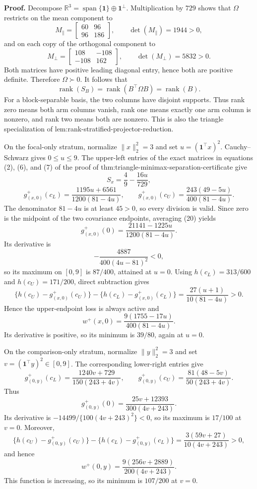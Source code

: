 \textbf{Proof.}
Decompose \(\mathbb R^3=\operatorname{span}\{\mathbf1\}\oplus\mathbf1^\perp\).  Multiplication by \(729\) shows that \(\Omega\) restricts on the mean component to
\[
 M_{\parallel}=\begin{bmatrix}60&96\\96&186\end{bmatrix},
 \qquad
 \det(M_{\parallel})=1944>0,
\]
and on each copy of the orthogonal component to
\[
 M_{\perp}=\begin{bmatrix}108&-108\\-108&162\end{bmatrix},
 \qquad
 \det(M_{\perp})=5832>0.
\]
Both matrices have positive leading diagonal entry, hence both are positive definite.  Therefore \(\Omega\succ0\).  It follows that
\[
 \operatorname{rank}(S_B)
 =\operatorname{rank}(B^{\top}\Omega B)
 =\operatorname{rank}(B).
 \tag{19}
\]
For a block-separable basis, the two columns have disjoint supports.  Thus rank zero means both arm columns vanish, rank one means exactly one arm column is nonzero, and rank two means both are nonzero.  This is also the triangle specialization of lem:rank-stratified-projector-reduction.

On the focal-only stratum, normalize \(\lVert x\rVert_2^2=3\) and set \(u=(\mathbf1^{\top}x)^2\).  Cauchy--Schwarz gives \(0\le u\le9\).  The upper-left entries of the exact matrices in equations (2), (6), and (7) of the proof of thm:triangle-minimax-separation-certificate give
\[
 S_x=\frac49-\frac{16u}{729},
\]
\[
 g_{(x,0)}^{+}(c_L)
 =\frac{1195u+6561}{1200(81-4u)},
 \qquad
 g_{(x,0)}^{+}(c_U)
 =\frac{243(49-5u)}{400(81-4u)}.
 \tag{20}
\]
The denominator \(81-4u\) is at least \(45>0\), so every division is valid.  Since zero is the midpoint of the two covariance endpoints, averaging (20) yields
\[
 g_{(x,0)}^{+}(0)
 =\frac{21141-1225u}{1200(81-4u)}.
 \tag{21}
\]
Its derivative is
\[
 -\frac{4887}{400(4u-81)^2}<0,
\]
so its maximum on \([0,9]\) is \(87/400\), attained at \(u=0\).  Using \(h(c_L)=313/600\) and \(h(c_U)=171/200\), direct subtraction gives
\[
 \{h(c_U)-g_{(x,0)}^{+}(c_U)\}
 -\{h(c_L)-g_{(x,0)}^{+}(c_L)\}
 =\frac{27(u+1)}{10(81-4u)}>0.
\]
Hence the upper-endpoint loss is always active and
\[
 w^{+}(x,0)=\frac{9(1755-17u)}{400(81-4u)}.
 \tag{22}
\]
Its derivative is positive, so its minimum is \(39/80\), again at \(u=0\).

On the comparison-only stratum, normalize \(\lVert y\rVert_2^2=3\) and set \(v=(\mathbf1^{\top}y)^2\in[0,9]\).  The corresponding lower-right entries give
\[
 g_{(0,y)}^{+}(c_L)
 =\frac{1240v+729}{150(243+4v)},
 \qquad
 g_{(0,y)}^{+}(c_U)
 =\frac{81(48-5v)}{50(243+4v)}.
 \tag{23}
\]
Thus
\[
 g_{(0,y)}^{+}(0)
 =\frac{25v+12393}{300(4v+243)}.
 \tag{24}
\]
Its derivative is \(-14499/\{100(4v+243)^2\}<0\), so its maximum is \(17/100\) at \(v=0\).  Moreover,
\[
 \{h(c_U)-g_{(0,y)}^{+}(c_U)\}
 -\{h(c_L)-g_{(0,y)}^{+}(c_L)\}
 =\frac{3(59v+27)}{10(4v+243)}>0,
\]
and hence
\[
 w^{+}(0,y)=\frac{9(256v+2889)}{200(4v+243)}.
 \tag{25}
\]
This function is increasing, so its minimum is \(107/200\) at \(v=0\).

